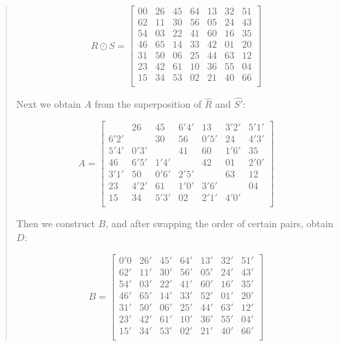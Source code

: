 \documentclass[
  11pt,
  a4paper]{book}
\begin{document}
\begin{quote}
\begin{equation}
  R \odot S = \begin{bmatrix}
      00 & 26 & 45 & 64 & 13 & 32 & 51 \\
      62 & 11 & 30 & 56 & 05 & 24 & 43 \\
      54 & 03 & 22 & 41 & 60 & 16 & 35 \\
      46 & 65 & 14 & 33 & 42 & 01 & 20 \\
      31 & 50 & 06 & 25 & 44 & 63 & 12 \\
      23 & 42 & 61 & 10 & 36 & 55 & 04 \\
      15 & 34 & 53 & 02 & 21 & 40 & 66 \\
  \end{bmatrix}
\end{equation}

Next we obtain $A$ from the superposition of $\hat{R}$ and
$\hat{S'}$:

\begin{equation}
  A = \begin{bmatrix}
           & 26   & 45   & 6'4' & 13   & 3'2' & 5'1' \\
      6'2' &      & 30   & 56   & 0'5' & 24   & 4'3' \\
      5'4' & 0'3' &      & 41   & 60   & 1'6' & 35   \\
      46   & 6'5' & 1'4' &      & 42   & 01   & 2'0' \\
      3'1' & 50   & 0'6' & 2'5' &      & 63   & 12   \\
      23   & 4'2' & 61   & 1'0' & 3'6' &      & 04   \\
      15   & 34   & 5'3' & 02   & 2'1' & 4'0' &      \\
  \end{bmatrix}
\end{equation}

Then we construct $B$, and after swapping the order of
certain pairs, obtain $D$:

\begin{equation}
  B = \begin{bmatrix}
      0'0 & 26' & 45' & 64' & 13' & 32' & 51'  \\
      62' & 11' & 30' & 56' & 05' & 24' & 43'  \\
      54' & 03' & 22' & 41' & 60' & 16' & 35'  \\
      46' & 65' & 14' & 33' & 52' & 01' & 20'  \\
      31' & 50' & 06' & 25' & 44' & 63' & 12'  \\
      23' & 42' & 61' & 10' & 36' & 55' & 04'  \\
      15' & 34' & 53' & 02' & 21' & 40' & 66'  \\
  \end{bmatrix}
\end{equation}


\end{quote}
\end{document}
